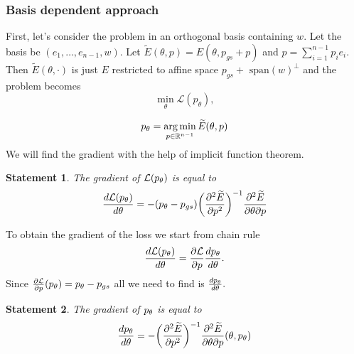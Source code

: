 \documentclass[a4paper,10pt]{report}
\newtheorem{statement}{Statement}
\begin{document}
\subsubsection{Basis dependent approach}

First, let's consider the problem in an orthogonal basis containing $w$.
Let the basis be $(e_1,\ldots, e_{n-1}, w)$.
Let $\widetilde{E}(\theta, p) = E(\theta, p_{gs}+ p)$ and $p = \sum_{i=1}^{n-1} p_i e_i$.
Then $\widetilde E(\theta, \cdot)$ is just $E$ restricted to affine space $p_{gs}+\text{ span} (w)^\perp$
and the problem becomes
\begin{equation}
  \min_\theta \mathcal{L}(p_\theta),
\end{equation}

\begin{equation}
 p_\theta = \operatorname*{arg\,min}_{p\in \mathbb{R}^{n-1}} \widetilde{E}(\theta, p)
\end{equation}
We will find the gradient with the help of implicit function theorem.

\begin{statement}
The gradient of $\mathcal{L}(p_\theta)$ is equal to
 \begin{equation}
 \frac{d\mathcal{L}(p_\theta)}{d \theta} = -(p_\theta - p_{gs}) \bigg(\frac{\partial^2  \widetilde{E}}{\partial p^2}\bigg)^{-1}  \frac{\partial^2  \widetilde{E}}{\partial \theta \partial p}
\end{equation}
\end{statement}

To obtain the gradient of the loss we start from chain rule
\begin{equation}
 \frac{d\mathcal{L}(p_\theta)}{d \theta} = \frac{\partial \mathcal{L}}{\partial p}\frac{dp_\theta}{d \theta}.
\end{equation}
Since $\frac{\partial \mathcal{L}}{\partial p}(p_\theta )= p_\theta-p_{gs}$ all we need to find is $\frac{dp_\theta}{d \theta}.$

\begin{statement}
The gradient of $p_\theta$ is equal to
 \begin{equation}
   \frac{dp_\theta}{d \theta} = -\bigg(\frac{\partial^2 \widetilde{E}}{\partial p^2}\bigg)^{-1} \frac{\partial^2 \widetilde{E}}{\partial \theta \partial p}(\theta, p_\theta)
 \end{equation}
\end{statement}
\end{document}
